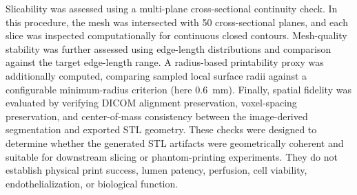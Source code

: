 \documentclass[anonymous]{iopjournal}
\begin{document}
Slicability was assessed using a multi-plane cross-sectional continuity check. In this procedure, the mesh was intersected with 50 cross-sectional planes, and each slice was inspected computationally for continuous closed contours. Mesh-quality stability was further assessed using edge-length distributions and comparison against the target edge-length range. A radius-based printability proxy was additionally computed, comparing sampled local surface radii against a configurable minimum-radius criterion (here \SI{0.6}{mm}). Finally, spatial fidelity was evaluated by verifying DICOM alignment preservation, voxel-spacing preservation, and center-of-mass consistency between the image-derived segmentation and exported STL geometry. These checks were designed to determine whether the generated STL artifacts were geometrically coherent and suitable for downstream slicing or phantom-printing experiments. They do not establish physical print success, lumen patency, perfusion, cell viability, endothelialization, or biological function.
\end{document}

